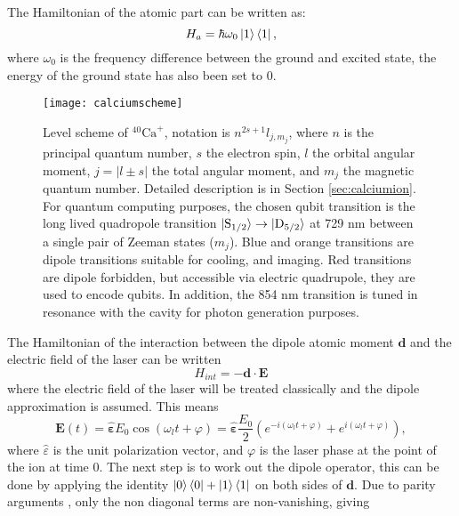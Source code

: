 The Hamiltonian of the atomic part can be written as:
\begin{equation}
H_a = \hbar\omega_0 \ket{1}\bra{1},
\end{equation}
where $\omega_0$ is the frequency difference between the ground and excited state, the energy of the ground state has also been set to 0.
\begin{figure}
\centering
\texttt{[image: calciumscheme]}
\caption{Level scheme of $^{40}\text{Ca}^+$, notation is $n^{2s+1}l_{j,m_j}$, where $n$ is the principal quantum number, $s$ the electron spin, $l$ the orbital angular moment, $j = |l\pm s|$ the total angular moment, and $m_j$ the magnetic quantum number. Detailed description is in Section \ref{sec:calciumion}. For quantum computing purposes, the chosen qubit transition is the long lived quadropole transition $\ket{\text{S}_{1/2}} \to \ket{\text{D}_{5/2}}$ at 729 nm between a single pair of Zeeman states ($m_j$). Blue and orange transitions are dipole transitions suitable for cooling, and imaging. Red transitions are dipole forbidden, but accessible via electric quadrupole, they are used to encode qubits. In addition, the 854 nm transition is tuned in resonance with the cavity for photon generation purposes.}
\label{qubitschemereference}
\end{figure}
The Hamiltonian of the interaction between the dipole atomic moment $\mathbf{d}$ and the electric field of the laser can be written \cite{steck}
\begin{equation}
H_{int} = -\mathbf{d}\cdot \mathbf{E}
\end{equation}
where the electric field of the laser  will be treated classically and the dipole approximation is assumed. This means
\begin{equation}
\mathbf{E}(t) = \hat{\mathbf{\varepsilon}} E_0 \cos(\omega_l t+\varphi) = \hat{\mathbf{\varepsilon}} \frac{E_0}{2} \left(e^{-i(\omega_l t+\varphi)} + e^{i(\omega_l t+\varphi)}\right),
\end{equation}
where $\hat{\varepsilon}$ is the unit polarization vector, and $\varphi$ is the laser phase at the point of the ion at time 0. The next step is to work out the dipole operator, this can be done by applying the identity $\ket{0}\bra{0} + \ket{1}\bra{1}$ on both sides of $\mathbf{d}$. Due to parity arguments \cite{steck}, only the non diagonal terms are non-vanishing, giving
